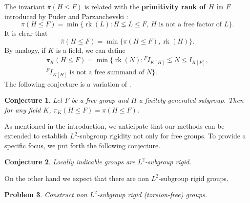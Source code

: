 \documentclass{amsart}
\newtheorem{Conj}{Conjecture}
\newtheorem{Problem}[Conj]{Problem}
\theoremstyle{definition}
\theoremstyle{remark}
\DeclareMathOperator{\rk}{rk}
\newcommand{\bpi}{\overline{\pi}}
\begin{document}
The invariant $\bpi(H\leq F)$ is related with the {\bf primitivity rank of $H$ in $F$} introduced by Puder and Parzanchevski \cite{PP15}:
$$\pi(H\leq F)=\min\{\rk(L): H\lneq L\le F,\ H \textrm{\ is not a free factor of\ }L\}.$$
It is clear that
$$    \bpi(H\leq F)=\min\{\pi(H\leq F),\rk(H)\}.
$$
By analogy, if $K$ is a field,  we can define
\begin{multline*}
    \pi_K(H\leq F)=\min\{\rk(N): {}^FI_{K[H]}\lneq N\le I_{K[F]},\\ {}^FI_{K[H]} \textrm{\ is not a free summand  of\ }N\}.\end{multline*}
The following conjecture is a variation of \cite[Conjecture 1.9]{EPS21}.
\begin{Conj}
Let $F$ be a free group and $H$ a finitely generated subgroup. Then for any field $K$, $\pi_K(H\leq F)=\pi(H\leq F)$.
\end{Conj}

As mentioned in the introduction, we anticipate that our methods can be extended to establish $L^2$-subgroup rigidity not only for free groups. To provide a specific focus, we put forth the following conjecture.
\begin{Conj}
Locally indicable groups are $L^2$-subgroup rigid.
\end{Conj}
On the other hand we expect that there are non $L^2$-subgroup rigid groups.
\begin{Problem}
Construct non $L^2$-subgroup rigid (torsion-free) groups.
\end{Problem}




\end{document}
